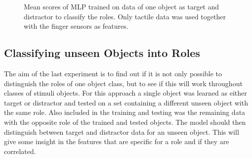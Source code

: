 
\begin{figure}[H]
	\caption{Mean scores of MLP trained on data of one object as target and distractor to classify the roles. Only tactile data was used together with the finger sensors as features.}
	\label{tnt}
\end{figure}

\subsection{Classifying unseen Objects into Roles}
The aim of the last experiment is to find out if it is not only possible to distinguish the roles of one object class, but to see if this will work throughout classes of stimuli objects. For this approach a single object was learned as either target or distractor and tested on a set containing a different unseen object with the same role. Also included in the training and testing was the remaining data with the opposite role of the trained and tested objects. The model should then distinguish between target and distractor data for an unseen object. This will give some insight in the features that are specific for a role and if they are correlated. 

